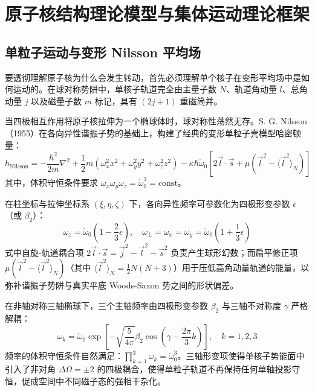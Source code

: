 
\chapter{原子核结构理论模型与集体运动理论框架}
\label{ch:theoretical_models}

\section{单粒子运动与变形 Nilsson 平均场}
\label{sec:nilsson_model}

要透彻理解原子核为什么会发生转动，首先必须理解单个核子在变形平均场中是如何运动的。在球对称势阱中，单核子轨道完全由主量子数 $N$、轨道角动量 $l$、总角动量 $j$ 以及磁量子数 $m$ 标记，具有 $(2j+1)$ 重磁简并。

当四极相互作用将原子核拉伸为一个椭球体时，球对称性荡然无存。S. G. Nilsson（1955）在各向异性谐振子势的基础上，构建了经典的变形单粒子壳模型哈密顿量：
\begin{equation}
    h_{\text{Nilsson}} = -\frac{\hbar^2}{2m} \nabla^2 + \frac{1}{2} m \left( \omega_x^2 x^2 + \omega_y^2 y^2 + \omega_z^2 z^2 \right) - \kappa \hbar \mathring{\omega}_0 \left[ 2 \vec{l} \cdot \vec{s} + \mu (\vec{l}^2 - \langle \vec{l}^2 \rangle_N) \right]
    \label{eq:nilsson_hamiltonian}
\end{equation}
其中，体积守恒条件要求 $\omega_x \omega_y \omega_z = \mathring{\omega}_0^3 = \text{const}$。

在柱坐标与拉伸坐标系 $(\xi, \eta, \zeta)$ 下，各向异性频率可参数化为四极形变参数 $\epsilon$（或 $\beta_2$）：
\begin{equation}
    \omega_z = \mathring{\omega}_0 \left( 1 - \frac{2}{3} \epsilon \right), \quad \omega_\perp = \omega_x = \omega_y = \mathring{\omega}_0 \left( 1 + \frac{1}{3} \epsilon \right)
    \label{eq:nilsson_frequencies}
\end{equation}
式中自旋-轨道耦合项 $2\vec{l}\cdot\vec{s} = \vec{j}^2 - \vec{l}^2 - \vec{s}^2$ 负责产生球形幻数；而扁平修正项 $\mu (\vec{l}^2 - \langle \vec{l}^2 \rangle_N)$（其中 $\langle \vec{l}^2 \rangle_N = \frac{1}{2}N(N+3)$）用于压低高角动量轨道的能量，以弥补谐振子势阱与真实平底 Woods-Saxon 势之间的形状偏差。

在非轴对称三轴椭球下，三个主轴频率由四极形变参数 $\beta_2$ 与三轴不对称度 $\gamma$ 严格解耦：
\begin{equation}
    \omega_k = \mathring{\omega}_0 \exp\left[ -\sqrt{\frac{5}{4\pi}} \beta_2 \cos\left(\gamma - \frac{2\pi}{3} k\right) \right], \quad k = 1, 2, 3
    \label{eq:triaxial_frequencies}
\end{equation}
频率的体积守恒条件自然满足：$\prod_{k=1}^3 \omega_k = \mathring{\omega}_0^3$。三轴形变项使得单核子势能面中引入了非对角 $\Delta \Omega = \pm 2$ 的四极耦合，使得单粒子轨道不再保持任何单轴投影守恒，促成空间中不同磁子态的强相干杂化。

